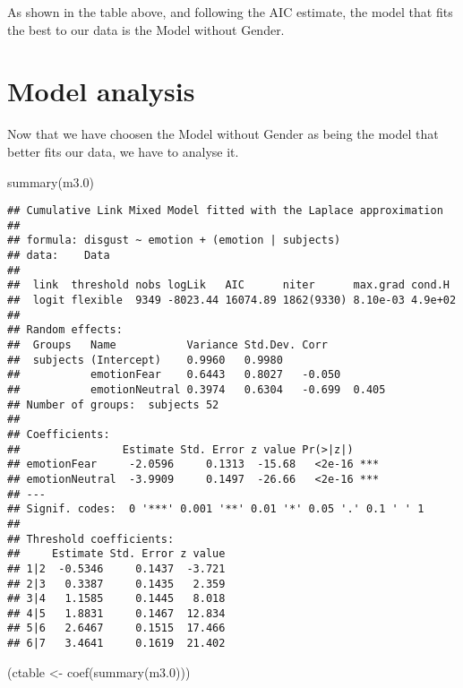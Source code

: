 \documentclass[
]{article}
\newenvironment{Shaded}{\begin{snugshade}}{\end{snugshade}}
\newcommand{\FloatTok}[1]{\textcolor[rgb]{0.00,0.00,0.81}{#1}}
\newcommand{\FunctionTok}[1]{\textcolor[rgb]{0.00,0.00,0.00}{#1}}
\newcommand{\NormalTok}[1]{#1}
\newcommand{\OtherTok}[1]{\textcolor[rgb]{0.56,0.35,0.01}{#1}}
\begin{document}
As shown in the table above, and following the AIC estimate, the model
that fits the best to our data is the Model without Gender.

\hypertarget{model-analysis}{%
\section{Model analysis}\label{model-analysis}}

Now that we have choosen the Model without Gender as being the model
that better fits our data, we have to analyse it.

\begin{Shaded}
\begin{Highlighting}[]
\FunctionTok{summary}\NormalTok{(m3}\FloatTok{.0}\NormalTok{)}
\end{Highlighting}
\end{Shaded}

\begin{verbatim}
## Cumulative Link Mixed Model fitted with the Laplace approximation
## 
## formula: disgust ~ emotion + (emotion | subjects)
## data:    Data
## 
##  link  threshold nobs logLik   AIC      niter      max.grad cond.H 
##  logit flexible  9349 -8023.44 16074.89 1862(9330) 8.10e-03 4.9e+02
## 
## Random effects:
##  Groups   Name           Variance Std.Dev. Corr          
##  subjects (Intercept)    0.9960   0.9980                 
##           emotionFear    0.6443   0.8027   -0.050        
##           emotionNeutral 0.3974   0.6304   -0.699  0.405 
## Number of groups:  subjects 52 
## 
## Coefficients:
##                Estimate Std. Error z value Pr(>|z|)    
## emotionFear     -2.0596     0.1313  -15.68   <2e-16 ***
## emotionNeutral  -3.9909     0.1497  -26.66   <2e-16 ***
## ---
## Signif. codes:  0 '***' 0.001 '**' 0.01 '*' 0.05 '.' 0.1 ' ' 1
## 
## Threshold coefficients:
##     Estimate Std. Error z value
## 1|2  -0.5346     0.1437  -3.721
## 2|3   0.3387     0.1435   2.359
## 3|4   1.1585     0.1445   8.018
## 4|5   1.8831     0.1467  12.834
## 5|6   2.6467     0.1515  17.466
## 6|7   3.4641     0.1619  21.402
\end{verbatim}

\begin{Shaded}
\begin{Highlighting}[]
\NormalTok{(ctable }\OtherTok{\textless{}{-}} \FunctionTok{coef}\NormalTok{(}\FunctionTok{summary}\NormalTok{(m3}\FloatTok{.0}\NormalTok{)))}
\end{Highlighting}
\end{Shaded}
\end{document}

